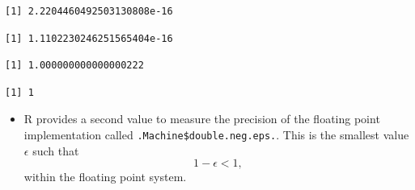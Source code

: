 \documentclass[
  9pt,
  a4paper,
  ignorenonframetext,
  notheorems]{beamer}
\newenvironment{Shaded}{\begin{snugshade}}{\end{snugshade}}
\newcommand{\AttributeTok}[1]{\textcolor[rgb]{0.40,0.45,0.13}{#1}}
\newcommand{\DecValTok}[1]{\textcolor[rgb]{0.68,0.00,0.00}{#1}}
\newcommand{\FunctionTok}[1]{\textcolor[rgb]{0.28,0.35,0.67}{#1}}
\newcommand{\NormalTok}[1]{\textcolor[rgb]{0.00,0.23,0.31}{#1}}
\newcommand{\SpecialCharTok}[1]{\textcolor[rgb]{0.37,0.37,0.37}{#1}}
\providecommand{\tightlist}{%
  \setlength{\itemsep}{0pt}\setlength{\parskip}{0pt}}\usepackage{longtable,booktabs,array}
\begin{document}
\begin{frame}[fragile]
\begin{Shaded}
\end{Shaded}

\begin{verbatim}
[1] 2.2204460492503130808e-16
\end{verbatim}

\begin{Shaded}
\end{Shaded}

\begin{verbatim}
[1] 1.1102230246251565404e-16
\end{verbatim}

\begin{Shaded}
\end{Shaded}

\begin{verbatim}
[1] 1.000000000000000222
\end{verbatim}

\begin{Shaded}
\end{Shaded}

\begin{verbatim}
[1] 1
\end{verbatim}

\begin{itemize}
\tightlist
\item
  R provides a second value to measure the precision of the floating
  point implementation called \texttt{.Machine\$double.neg.eps.}. This
  is the smallest value \(\epsilon\) such that \[
  1 - \epsilon < 1,
  \] within the floating point system.
\end{itemize}


\end{frame}
\end{document}
